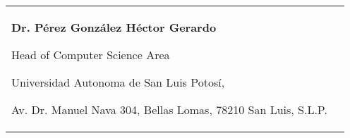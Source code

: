 

\begin{tabularx}{\textwidth}{@{}X X@{}}

\textbf{Dr. Pérez González Héctor Gerardo}\par
Head of Computer Science Area\par\vspace{2}
Universidad Autonoma de San Luis Potosí,\par 
Av. Dr. Manuel Nava 304, Bellas Lomas, 78210 San Luis, S.L.P.\par \vspace{2}
\makefield{\faEnvelopeO}{\url{hectorgerardo@uaslp.mx}}

& 
\\

\end{tabularx}
